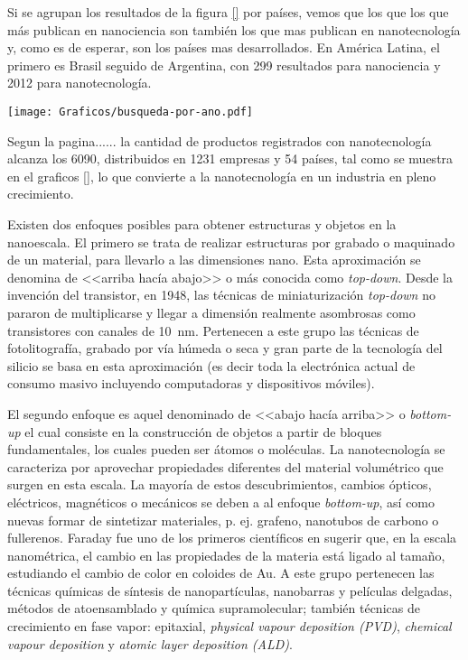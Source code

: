 	Si se agrupan los resultados de la figura \ref{} por países, vemos que los que los que más publican en nanociencia son también los que mas publican en nanotecnología y, como es de esperar, son los países mas desarrollados. En América Latina, el primero es Brasil seguido de Argentina, con 299 resultados para nanociencia y 2012 para nanotecnología.

		\begin{center}
 			\texttt{[image: Graficos/busqueda-por-ano.pdf]}
 		    \end{center}

	Segun la pagina...... la cantidad de productos registrados con nanotecnología alcanza los 6090, distribuidos en 1231 empresas y 54 países, tal como se muestra en el graficos \ref{}, lo que convierte a la nanotecnología en un industria en pleno crecimiento.



	Existen dos enfoques posibles para obtener estructuras y objetos en la nanoescala. El primero se trata de realizar estructuras por grabado o maquinado de un material, para llevarlo a las dimensiones nano. Esta aproximación se denomina de <<arriba hacía abajo>> o más conocida como \textit{top-down}. Desde la invención del transistor, en 1948, las técnicas de miniaturización \textit{top-down} no pararon de multiplicarse y llegar a dimensión realmente asombrosas como transistores con canales de \SI{10}{nm}. Pertenecen a este grupo las técnicas de fotolitografía, grabado por vía húmeda o seca y gran parte de la tecnología del silicio se basa en esta aproximación (es decir toda la electrónica actual de consumo masivo incluyendo computadoras y dispositivos móviles). 

	El segundo enfoque es aquel denominado de <<abajo hacía arriba>> o \textit{bottom-up} el cual consiste en la construcción de objetos a partir de bloques fundamentales, los cuales pueden ser átomos o moléculas. La nanotecnología se caracteriza por aprovechar propiedades diferentes del material volumétrico que surgen en esta escala. La mayoría de estos descubrimientos, cambios ópticos, eléctricos, magnéticos o mecánicos se deben a al enfoque \textit{bottom-up}, así como nuevas formar de sintetizar materiales, p. ej. grafeno, nanotubos de carbono o fullerenos. Faraday fue uno de los primeros científicos en sugerir que, en la escala nanométrica, el cambio en las propiedades de la materia está ligado al tamaño, estudiando el cambio de color en coloides de Au\cite{faraday1857}. A este grupo pertenecen las técnicas químicas de síntesis de nanopartículas, nanobarras y películas delgadas, métodos de atoensamblado y química supramolecular; también técnicas de crecimiento en fase vapor: epitaxial, \textit{physical vapour deposition (PVD)}, \textit{chemical vapour deposition} y \textit{atomic layer deposition (ALD)}.

